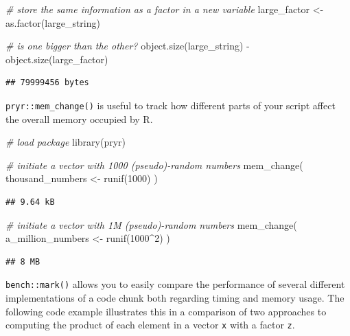 \documentclass[
  12pt,
]{style/krantz}
\newenvironment{Shaded}{\begin{snugshade}}{\end{snugshade}}
\newcommand{\CommentTok}[1]{\textcolor[rgb]{0.56,0.35,0.01}{\textit{#1}}}
\newcommand{\DecValTok}[1]{\textcolor[rgb]{0.00,0.00,0.81}{#1}}
\newcommand{\FunctionTok}[1]{\textcolor[rgb]{0.00,0.00,0.00}{#1}}
\newcommand{\NormalTok}[1]{#1}
\newcommand{\OtherTok}[1]{\textcolor[rgb]{0.56,0.35,0.01}{#1}}
\newcommand{\SpecialCharTok}[1]{\textcolor[rgb]{0.00,0.00,0.00}{#1}}
\begin{document}
\begin{Shaded}
\begin{Highlighting}[]
\CommentTok{\# store the same information as a factor in a new variable}
\NormalTok{large\_factor }\OtherTok{\textless{}{-}} \FunctionTok{as.factor}\NormalTok{(large\_string)}

\CommentTok{\# is one bigger than the other?}
\FunctionTok{object.size}\NormalTok{(large\_string) }\SpecialCharTok{{-}} \FunctionTok{object.size}\NormalTok{(large\_factor)}
\end{Highlighting}
\end{Shaded}

\begin{verbatim}
## 79999456 bytes
\end{verbatim}

\texttt{pryr::mem\_change()} is useful to track how different parts of your script affect the overall memory occupied by R.

\begin{Shaded}
\begin{Highlighting}[]
\CommentTok{\# load package}
\FunctionTok{library}\NormalTok{(pryr)}

\CommentTok{\# initiate a vector with 1000 (pseudo){-}random numbers}
\FunctionTok{mem\_change}\NormalTok{(}
\NormalTok{        thousand\_numbers }\OtherTok{\textless{}{-}} \FunctionTok{runif}\NormalTok{(}\DecValTok{1000}\NormalTok{)}
\NormalTok{        )}
\end{Highlighting}
\end{Shaded}

\begin{verbatim}
## 9.64 kB
\end{verbatim}

\begin{Shaded}
\begin{Highlighting}[]
\CommentTok{\# initiate a vector with 1M (pseudo){-}random numbers}
\FunctionTok{mem\_change}\NormalTok{(}
\NormalTok{        a\_million\_numbers }\OtherTok{\textless{}{-}} \FunctionTok{runif}\NormalTok{(}\DecValTok{1000}\SpecialCharTok{\^{}}\DecValTok{2}\NormalTok{)}
\NormalTok{        )}
\end{Highlighting}
\end{Shaded}

\begin{verbatim}
## 8 MB
\end{verbatim}

\texttt{bench::mark()} allows you to easily compare the performance of several different implementations of a code chunk both regarding timing and memory usage. The following code example illustrates this in a comparison of two approaches to computing the product of each element in a vector \texttt{x} with a factor \texttt{z}.
\end{document}
